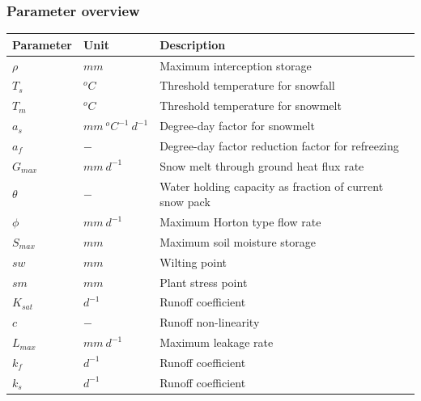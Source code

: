 \subsubsection{Parameter overview}
\begin{table}[htbp]
  \centering
    \begin{tabular}{lll}
    \toprule
    Parameter & Unit  & Description \\
    \midrule
    $\rho$ & $mm$  & Maximum interception storage \\
    $T_s$ & $^oC$ & Threshold temperature for snowfall \\
    $T_m$ & $^oC$ & Threshold temperature for snowmelt \\
    $a_s$ & $mm~^oC^{-1}~d^{-1}$ & Degree-day factor for snowmelt \\
    $a_f$ & $-$   & Degree-day factor reduction factor for refreezing \\
    $G_{max}$ & $mm~d^{-1}$ & Snow melt through ground heat flux rate \\
    $\theta$ & $-$   & Water holding capacity as fraction of current snow pack \\
    $\phi$ & $mm~d^{-1}$ & Maximum Horton type flow rate \\
    $S_{max}$ & $mm$  & Maximum soil moisture storage \\
    $sw$  & $mm$  & Wilting point \\
    $sm$  & $mm$  & Plant stress point \\
    $K_{sat}$ & $d^{-1}$ & Runoff coefficient \\
    $c$   & $-$   & Runoff non-linearity \\
    $L_{max}$ & $mm~d^{-1}$ & Maximum leakage rate \\
    $k_f$ & $d^{-1}$ & Runoff coefficient \\
    $k_s$ & $d^{-1}$ & Runoff coefficient \\
    \bottomrule
    \end{tabular}%
  \label{tab:addlabel}%
\end{table}%

